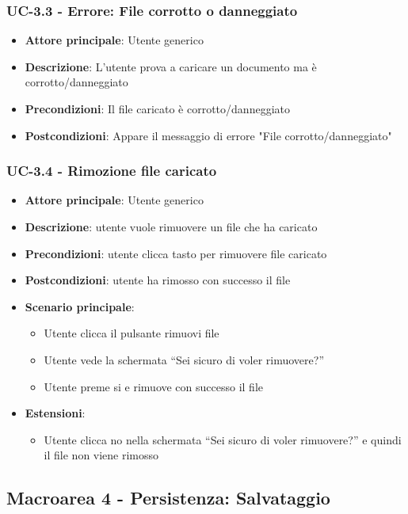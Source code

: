 \documentclass[11pt,a4paper]{article}
\begin{document}
\subsubsection{UC-3.3 - Errore: File corrotto o danneggiato}
\begin{itemize}
    \item \textbf{Attore principale}: Utente generico
    \item \textbf{Descrizione}: L'utente prova a caricare un documento ma è corrotto/danneggiato
    \item \textbf{Precondizioni}: Il file caricato è corrotto/danneggiato
    \item \textbf{Postcondizioni}: Appare il messaggio di errore "File corrotto/danneggiato"
\end{itemize}

\subsubsection{UC-3.4 - Rimozione file caricato}
\begin{itemize}
    \item \textbf{Attore principale}: Utente generico
    \item \textbf{Descrizione}: utente vuole rimuovere un file che ha caricato
    \item \textbf{Precondizioni}: utente clicca tasto per rimuovere file caricato
    \item \textbf{Postcondizioni}: utente ha rimosso con successo il file
    \item \textbf{Scenario principale}:
        \begin{itemize}
            \item Utente clicca il pulsante rimuovi file
            \item Utente vede la schermata “Sei sicuro di voler rimuovere?”
            \item Utente preme si e rimuove con successo il file
        \end{itemize}
        \item \textbf{Estensioni}:
        \begin{itemize}
            \item Utente clicca no nella schermata “Sei sicuro di voler rimuovere?” e quindi il file non viene rimosso
        \end{itemize}
\end{itemize}


\newpage

\subsection{Macroarea 4 - Persistenza: Salvataggio}
\end{document}
